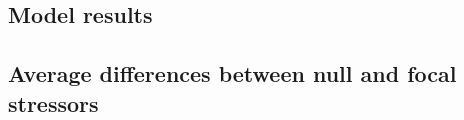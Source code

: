 \documentclass[12pt,letterpaper]{article}
\begin{document}
\newpage

\subsection{Model results}

\begin{landscape}

\end{landscape}

\begin{landscape}

\end{landscape}

\begin{landscape}

\end{landscape}

\begin{landscape}

\end{landscape}

\newpage

\subsection{Average differences between null and focal stressors}

\begin{landscape}

\end{landscape}

\begin{landscape}

\end{landscape}

\begin{landscape}

\end{landscape}

\begin{landscape}

\end{landscape}



\begin{landscape}

\end{landscape}

\begin{landscape}

\end{landscape}

\begin{landscape}

\end{landscape}
\end{document}

